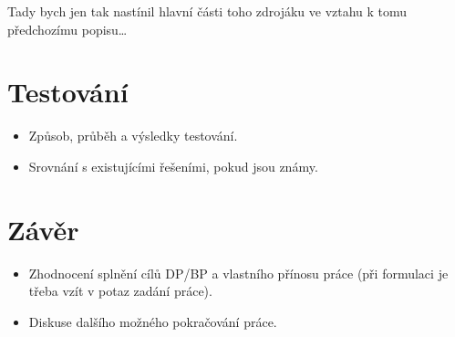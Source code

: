 \documentclass[11pt,twoside,a4paper]{book}
\begin{document}
Tady bych jen tak nastínil hlavní části toho zdrojáku ve vztahu k tomu předchozímu popisu\ldots

\chapter{Testování}
\label{chap:test}

\begin{itemize}
 \item Způsob, průběh a výsledky testování.
 \item Srovnání s existujícími řešeními, pokud jsou známy.
\end{itemize} 


\chapter{Závěr}

\begin{itemize}
\item Zhodnocení splnění cílů DP/BP a  vlastního přínosu práce (při formulaci je třeba vzít v potaz zadání práce).
\item Diskuse dalšího možného pokračování práce.
\end{itemize} 


%




%
\def\CS{$\cal C\kern-0.1667em\lower.5ex\hbox{$\cal S$}\kern-0.075em $}

\end{document}
